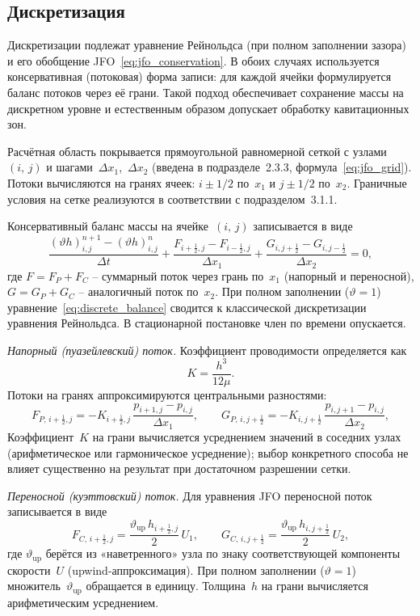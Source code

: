 \subsection{Дискретизация}

Дискретизации подлежат уравнение Рейнольдса (при полном заполнении зазора) и его обобщение JFO~\eqref{eq:jfo_conservation}. В обоих случаях используется консервативная (потоковая) форма записи: для каждой ячейки формулируется баланс потоков через её грани. Такой подход обеспечивает сохранение массы на дискретном уровне и естественным образом допускает обработку кавитационных зон.

Расчётная область покрывается прямоугольной равномерной сеткой с узлами~$(i,\,j)$ и шагами~$\Delta x_1$,~$\Delta x_2$ (введена в подразделе~2.3.3, формула~\eqref{eq:jfo_grid}). Потоки вычисляются на гранях ячеек: $i \pm 1/2$ по~$x_1$ и $j \pm 1/2$ по~$x_2$. Граничные условия на сетке реализуются в соответствии с подразделом~3.1.1.

Консервативный баланс массы на ячейке~$(i,\,j)$ записывается в виде
\begin{equation}\label{eq:discrete_balance}
  \frac{(\vartheta h)_{i,j}^{n+1} - (\vartheta h)_{i,j}^{n}}{\Delta t}
  + \frac{F_{i+\frac{1}{2},j} - F_{i-\frac{1}{2},j}}{\Delta x_1}
  + \frac{G_{i,j+\frac{1}{2}} - G_{i,j-\frac{1}{2}}}{\Delta x_2}
  = 0,
\end{equation}
где $F = F_P + F_C$ -- суммарный поток через грань по~$x_1$ (напорный и переносной), $G = G_P + G_C$ -- аналогичный поток по~$x_2$. При полном заполнении ($\vartheta = 1$) уравнение~\eqref{eq:discrete_balance} сводится к классической дискретизации уравнения Рейнольдса. В стационарной постановке член по времени опускается.

\textit{Напорный (пуазейлевский) поток.}
Коэффициент проводимости определяется как
\[
  K = \frac{h^3}{12\mu}.
\]
Потоки на гранях аппроксимируются центральными разностями:
\begin{equation}\label{eq:flux_poiseuille}
  F_{P,\,i+\frac{1}{2},j} = -K_{i+\frac{1}{2},j}\,
    \frac{p_{i+1,j} - p_{i,j}}{\Delta x_1}, \qquad
  G_{P,\,i,j+\frac{1}{2}} = -K_{i,j+\frac{1}{2}}\,
    \frac{p_{i,j+1} - p_{i,j}}{\Delta x_2},
\end{equation}
Коэффициент~$K$ на грани вычисляется усреднением значений в соседних узлах (арифметическое или гармоническое усреднение); выбор конкретного способа не влияет существенно на результат при достаточном разрешении сетки.

\textit{Переносной (куэттовский) поток.}
Для уравнения JFO переносной поток записывается в виде
\begin{equation}\label{eq:flux_couette}
  F_{C,\,i+\frac{1}{2},j} = \frac{\vartheta_{\mathrm{up}}\,
    h_{i+\frac{1}{2},j}}{2}\,U_1, \qquad
  G_{C,\,i,j+\frac{1}{2}} = \frac{\vartheta_{\mathrm{up}}\,
    h_{i,j+\frac{1}{2}}}{2}\,U_2,
\end{equation}
где $\vartheta_{\mathrm{up}}$ берётся из «наветренного» узла по знаку соответствующей компоненты скорости~$U$ (upwind-аппроксимация). При полном заполнении ($\vartheta = 1$) множитель~$\vartheta_{\mathrm{up}}$ обращается в единицу. Толщина~$h$ на грани вычисляется арифметическим усреднением.

